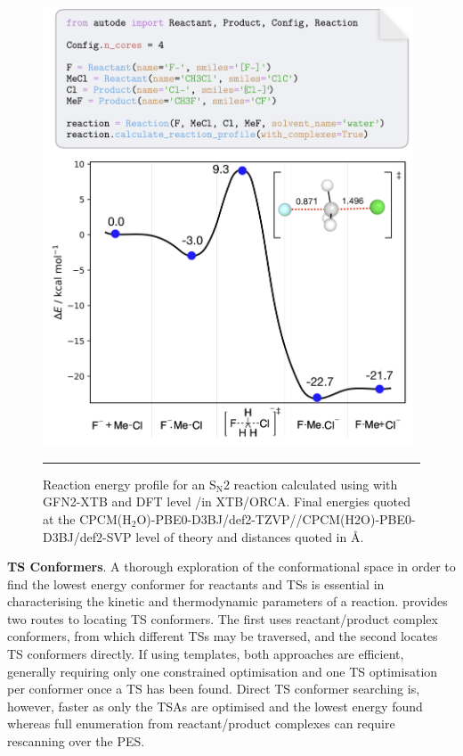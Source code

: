 \documentclass[../../main.tex]{subfiles}
\begin{document}
\begin{figure}[h!]
	\vspace{0.4cm}
	\centering
	\includegraphics[width=11cm]{5/autode/figs/fig5}
	\vspace{0.4cm}
	\hrule
	\caption{Reaction energy profile for an S$_\text{N}$2 reaction calculated using \ade with GFN2-XTB and DFT level \lmethod/\hmethod in XTB/ORCA. Final energies quoted at the CPCM(H$_2$O)-PBE0-D3BJ/def2-TZVP//CPCM(H2O)-PBE0-D3BJ/def2-SVP level of theory and distances quoted in \AA.}
	\label{fig::ade_5}
\end{figure}

{\bfseries{TS Conformers}}. A thorough exploration of the conformational space in order to find the lowest energy conformer for reactants and TSs is essential in characterising the kinetic and thermodynamic parameters of a reaction. \ade provides two routes to locating TS conformers. The first uses reactant/product complex conformers, from which different TSs may be traversed, and the second locates TS conformers directly. If using templates, both approaches are efficient, generally requiring only one constrained optimisation and one TS optimisation per conformer once a TS has been found. Direct TS conformer searching is, however, faster as only the TSAs are optimised and the lowest energy found whereas full enumeration from reactant/product complexes can require rescanning over the PES.
\end{document}

